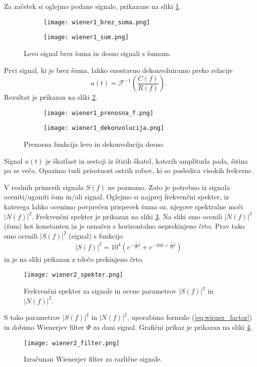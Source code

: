 \documentclass[12pt,a4paper]{article}
\begin{document}
Za začetek si oglejmo podane signale, prikazane na sliki \ref{fig:slika8}.
\begin{figure}[H]
    \centering
    \begin{subfigure}[b]{0.45\textwidth}
        \texttt{[image: wiener1\_brez\_suma.png]}
    \end{subfigure}
    \begin{subfigure}[b]{0.45\textwidth}
        \texttt{[image: wiener1\_sum.png]}
    \end{subfigure}
    \caption{Levo signal brez šuma in desno signali s šumom.} \label{fig:slika8}
\end{figure}

\noindent Prvi signal, ki je brez šuma, lahko enostavno dekonvoluiramo preko relacije
\begin{equation}
u(t)= \mathcal{F}^{-1} \left( \frac{C(f)}{R(f)}\right).
\end{equation}
Rezultat je prikazan na sliki \ref{fig:slika9}.
\begin{figure}[H]
    \centering
    \begin{subfigure}[b]{0.45\textwidth}
        \texttt{[image: wiener1\_prenosna\_f.png]}
    \end{subfigure}
    \begin{subfigure}[b]{0.45\textwidth}
        \texttt{[image: wiener1\_dekonvolucija.png]}
    \end{subfigure}
    \caption{Prenosna funkcija levo in dekonvolucija desno.} \label{fig:slika9}
\end{figure}
\noindent Signal $u(t)$ je škatlast in sestoji iz štirih škatel, katerih amplituda pada, širina pa se veča. Opazimo tudi prisotnost ostrih robov, ki so posledica visokih frekvenc.

V realnih primerih signala $S(f)$ ne poznamo. Zato je potrebno iz signala oceniti/uganiti šum in/ali signal. Oglejmo si najprej frekvenčni spekter, iz katerega lahko ocenimo povprečen prispevek šuma oz. njegove spektralne moči $|N(f)|^{2}$. Frekvenčni spekter je prikazan na sliki \ref{fig:slika10}. Na sliki smo ocenili $|N(f)|^{2}$ (šum) kot konstanten in je označen s horizontalno neprekinjeno črto. Prav tako smo ocenili $|S(f)|^{2}$ (signal) s funkcijo
\begin{align*}
|S(f)|^{2}=10^{4} (e^{-\frac{5}{16} t} + e^{-160 +\frac{5}{16} t})
\end{align*}
in je na sliki prikazan z rdečo prekinjeno črto.
\begin{figure}[H]
    \centering
        \texttt{[image: wiener2\_spekter.png]}
    \caption{Frekvenčni spekter za signale in ocene parametrov $|S(f)|^{2}$ in $|N(f)|^{2}$.} \label{fig:slika10}
\end{figure}
\noindent S tako parametrov $|S(f)|^{2}$ in $|N(f)|^{2}$, uporabimo formulo (\ref{eq:wiener_factor}) in dobimo Wienerjev filter $\Phi$ za dani signal. Grafični prikaz je prikazan na sliki \ref{fig:slika11}.
\begin{figure}[H]
    \centering
        \texttt{[image: wiener2\_filter.png]}
    \caption{Izračunan Wienerjev filter za različne signale.} \label{fig:slika11}
\end{figure}
\end{document}
